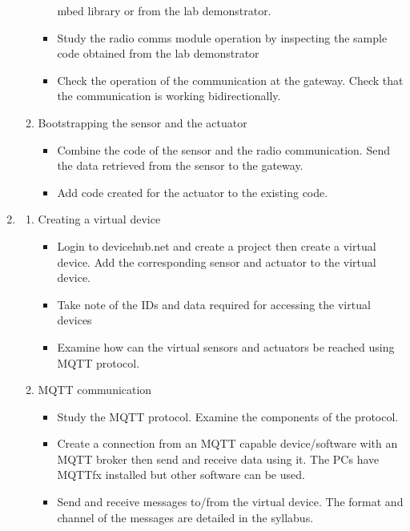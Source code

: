 \documentclass[a4paper]{article}
\begin{document}
\begin{enumerate}
\begin{enumerate}
\begin{itemize}
            mbed library or from the lab demonstrator.
            \item Study the radio comms module operation by inspecting the sample code obtained from the
            lab demonstrator
            \item Check the operation of the communication at the gateway. Check that the communication is
            working bidirectionally.
        \end{itemize}
        \item Bootstrapping the sensor and the actuator
        \begin{itemize}
            \item Combine the code of the sensor and the radio communication. Send the data retrieved 
            from the sensor to the gateway.
            \item Add code created for the actuator to the existing code.
        \end{itemize}
    \end{enumerate}
    \item \begin{enumerate}
        \item Creating a virtual device
        \begin{itemize}
            \item Login to devicehub.net and create a project then create a virtual device. 
            Add the corresponding sensor and actuator to the virtual device.
            \item Take note of the IDs and data required for accessing the virtual devices
            \item Examine how can the virtual sensors and actuators be reached using MQTT protocol.
        \end{itemize}
        \item MQTT communication
        \begin{itemize}
            \item Study the MQTT protocol. Examine the components of the protocol.
            \item Create a connection from an MQTT capable device/software with an MQTT broker then
            send and receive data using it. The PCs have MQTTfx installed but other software can
            be used.
            \item Send and receive messages to/from the virtual device. The format and channel of
            the messages are detailed in the syllabus.
        \end{itemize}

\end{enumerate}
\end{enumerate}
\end{document}
